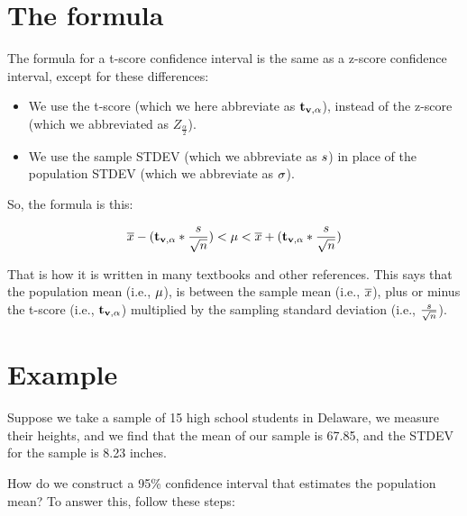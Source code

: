 \documentclass[../../../main.tex]{subfiles}
\begin{document}
\section{The formula}

The formula for a t-score confidence interval is the same as a z-score confidence interval, except for these differences:

\begin{itemize}
  \item We use the t-score (which we here abbreviate as $\tscore/$), instead of the z-score (which we abbreviated as $Z_{\frac{\alpha}{2}}$).
  \item We use the sample STDEV (which we abbreviate as $s$) in place of the population STDEV (which we abbreviate as $\sigma$).
\end{itemize}

\noindent
So, the formula is this:

\begin{equation*}
  \samplemean{x} - (\tscore/ * \frac{\samplestdev}{\sqrt{\samplesize/}}) < \populationmean < \samplemean{x} + (\tscore/ * \frac{\samplestdev}{\sqrt{\samplesize/}})
\end{equation*}

\noindent
That is how it is written in many textbooks and other references. This says that the population mean (i.e., $\mu$), is between the sample mean (i.e., $\overline{x}$), plus or minus the t-score (i.e., $\tscore/$) multiplied by the sampling standard deviation (i.e., $\frac{\samplestdev}{\sqrt{\samplesize/}}$).


\section{Example}

Suppose we take a sample of 15 high school students in Delaware, we measure their heights, and we find that the mean of our sample is 67.85, and the STDEV for the sample is 8.23 inches. 

How do we construct a 95\% confidence interval that estimates the population mean? To answer this, follow these steps:
\end{document}
